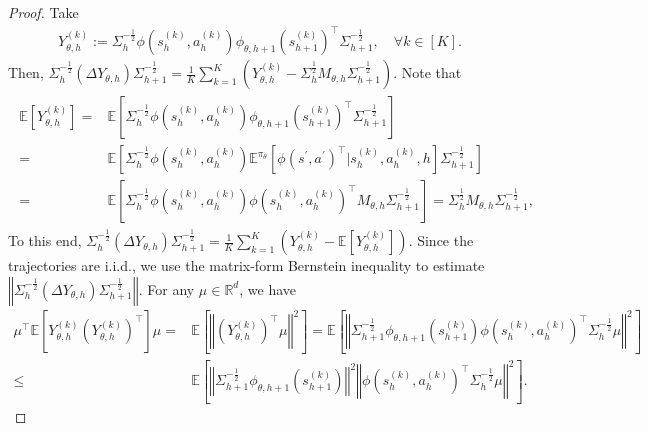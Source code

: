 \documentclass{article}
\numberwithin{equation}{section}
\begin{document}
\begin{proof}
Take
\begin{align*}
	Y_{\theta,h}^{(k)}:=\Sigma_h^{-\frac{1}{2}}\phi\left(s^{(k)}_h,a^{(k)}_h\right)\phi_{\theta,h+1}\left(s^{(k)}_{h+1}\right)^\top\Sigma_{h+1}^{-\frac{1}{2}},\quad\forall k\in[K]. 
\end{align*}
Then, $\Sigma_h^{-\frac{1}{2}}\left(\Delta Y_{\theta,h}\right)\Sigma_{h+1}^{-\frac{1}{2}} =\frac{1}{K}\sum_{k=1}^K\left(Y_{\theta,h}^{(k)}-\Sigma_h^{\frac{1}{2}}M_{\theta,h} \Sigma^{-\frac{1}{2}}_{h+1}\right)$. Note that
\begin{align}
    \label{SMS0} 
    \begin{aligned} 
        \mathbb{E}\left[Y_{\theta,h}^{(k)}\right]=&\mathbb{E}\left[\Sigma_h^{-\frac{1}{2}}\phi\left(s^{(k)}_h,a^{(k)}_h\right)\phi_{\theta,h+1}\left(s^{(k)}_{h+1}\right)^\top\Sigma_{h+1}^{-\frac{1}{2}}\right]\\
        =&\mathbb{E}\left[\Sigma_h^{-\frac{1}{2}} \phi\left(s^{(k)}_h,a^{(k)}_h\right)\mathbb{E}^{\pi_\theta}\left[\phi\left(s^\prime, a^\prime\right)^\top \vert s^{(k)}_h,a^{(k)}_h, h\right]\Sigma_{h+1}^{-\frac{1}{2}}\right]\\
        =&\mathbb{E}\left[\Sigma_h^{-\frac{1}{2}}\phi\left(s^{(k)}_h,a^{(k)}_h\right)\phi\left(s^{(k)}_h,a^{(k)}_h\right)^\top M_{\theta,h}\Sigma_{h+1}^{-\frac{1}{2}}\right]=\Sigma_h^{\frac{1}{2}}M_{\theta,h}\Sigma_{h+1}^{-\frac{1}{2}}, 
    \end{aligned}
\end{align}
To this end, $\Sigma_h^{-\frac{1}{2}}\left(\Delta Y_{\theta,h}\right)\Sigma_{h+1}^{-\frac{1}{2}}=\frac{1}{K}\sum_{k=1}^K\left( Y_{\theta,h}^{(k)}-\mathbb{E}\left[Y_{\theta,h}^{(k)}\right]\right)$. Since the trajectories are \textrm{i.i.d.}, we use the matrix-form Bernstein inequality to estimate $\left\Vert\Sigma_h^{-\frac{1}{2}}(\Delta Y_{\theta,h})\Sigma_{h+1}^{-\frac{1}{2}}\right\Vert$. For any $\mu\in \mathbb{R}^d$, we have
\begin{align*}
    \mu^\top\mathbb{E}\left[Y_{\theta,h}^{(k)}\left(Y_{\theta,h}^{(k)}\right)^\top\right]\mu=&\mathbb{E}\left[\left\Vert\left(Y_{\theta,h}^{(k)}\right)^\top\mu\right\Vert^2\right]=\mathbb{E}\left[\left\Vert\Sigma_{h+1}^{-\frac{1}{2}}\phi_{\theta,h+1}\left(s_{h+1}^{(k)}\right)\phi\left(s_h^{(k)},a_h^{(k)}\right)^\top\Sigma_h^{-\frac{1}{2}}\mu\right\Vert^2\right]\\
    \leq&\mathbb{E}\left[\left\Vert\Sigma_{h+1}^{-\frac{1}{2}} \phi_{\theta,h+1}\left(s_{h+1}^{(k)}\right)\right\Vert^2\left\Vert\phi\left(s_h^{(k)}, a_h^{(k)}\right)^\top\Sigma_h^{-\frac{1}{2}}\mu\right\Vert^2\right]. 

\end{align*}
\end{proof}
\end{document}
